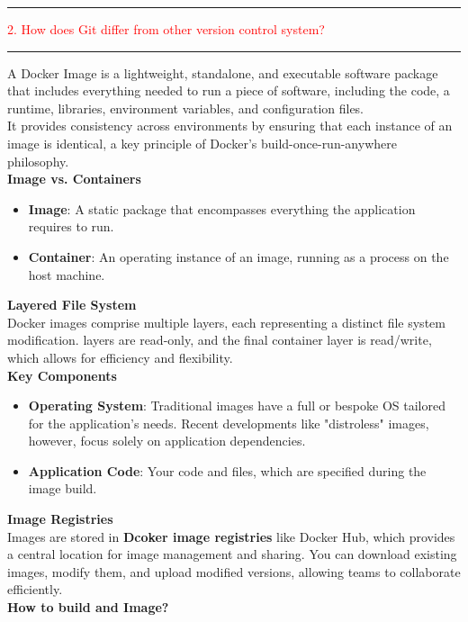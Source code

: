 \documentclass{article}
\begin{document}
\noindent
{\color{red} \rule{\linewidth}{0.5mm}}
\textcolor{red}{2. How does Git differ from other version control system?} \\
\noindent
{\color{red} \rule{\linewidth}{0.5mm}}
A Docker Image is a lightweight, standalone, and executable software package that includes everything needed to run a piece of software, including the code, a runtime, libraries, environment variables, and configuration files. \\
It provides consistency across environments by ensuring that each instance of an image is identical, a key principle of Docker's build-once-run-anywhere philosophy. \\
\textbf{Image vs. Containers} \\
\begin{itemize}
\color{blue}
\item \textbf{Image}: A static package that encompasses everything the application requires to run.
\item \textbf{Container}: An operating instance of an image, running as a process on the host machine.
\end{itemize}
\textbf{Layered File System} \\
Docker images comprise multiple layers, each representing a distinct file system modification. layers are read-only, and the final container layer is read/write, which allows for efficiency and flexibility. \\   
\textbf{Key Components} \\
\begin{itemize}
\color{blue}
\item \textbf{Operating System}: Traditional images have a full or bespoke OS tailored for the application's needs. Recent developments like "distroless" images, however, focus solely on application dependencies. 
\item \textbf{Application Code}: Your code and files, which are specified during the image build.
\end{itemize}
\textbf{Image Registries} \\
Images are stored in \textbf{Dcoker image registries} like Docker Hub, which provides a central location for image management and sharing. You can download existing images, modify them, and upload modified versions, allowing teams to collaborate efficiently. \\
\textbf{How to build and Image?} \\
\end{document}
